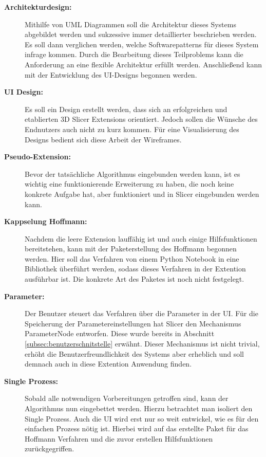 \begin{description}
	\item[\textbf{Architekturdesign:}] Mithilfe von UML Diagrammen soll die Architektur
		dieses Systems abgebildet werden und sukzessive immer detaillierter beschrieben
		werden. Es soll dann verglichen werden, welche Softwarepatterns für dieses System
		infrage kommen. Durch die Bearbeitung dieses Teilproblems kann die
		Anforderung an eine flexible Architektur erfüllt werden. Anschließend kann mit
		der Entwicklung des UI-Designs begonnen werden.

	\item[\textbf{UI Design:}] Es soll ein Design erstellt werden, dass sich an
		erfolgreichen und etablierten 3D Slicer Extensions orientiert. Jedoch sollen
		die Wünsche des Endnutzers auch nicht zu kurz kommen. Für eine
		Visualisierung des Designs bedient sich diese Arbeit der Wireframes.

	\item[\textbf{Pseudo-Extension:}] Bevor der tatsächliche Algorithmus eingebunden
		werden kann, ist es wichtig eine funktionierende Erweiterung zu haben, die noch
		keine konkrete Aufgabe hat, aber funktioniert und in Slicer eingebunden
		werden kann.

	\item[\textbf{Kappselung Hoffmann:}] Nachdem die leere Extension lauffähig ist
		und auch einige Hilfsfunktionen bereitstehen, kann mit der Paketerstellung
		des Hoffmann begonnen werden. Hier soll das Verfahren von einem Python Notebook
		in eine Bibliothek überführt werden, sodass dieses Verfahren in der
		Extention ausführbar ist. Die konkrete Art des Paketes ist noch nicht festgelegt.

	\item[\textbf{Parameter:}] Der Benutzer steuert das Verfahren über die Parameter
		in der UI. Für die Speicherung der Parametereinstellungen hat Slicer den
		Mechanismus ParameterNode entworfen. Diese wurde bereits in Abschnitt \ref{subsec:benutzerschnitstelle}
		erwähnt. Dieser Mechanismus ist nicht trivial, erhöht die Benutzerfreundlichkeit
		des Systems aber erheblich und soll demnach auch in diese Extention Anwendung
		finden.

	\item[\textbf{Single Prozess:}] Sobald alle notwendigen Vorbereitungen getroffen
		sind, kann der Algorithmus nun eingebettet werden. Hierzu betrachtet man isoliert
		den Single Prozess. Auch die UI wird erst nur so weit entwickel, wie es für den
		einfachen Prozess nötig ist. Hierbei wird auf das erstellte Paket für das
		Hoffmann Verfahren und die zuvor erstellen Hilfsfunktionen zurückgegriffen.


\end{description}
